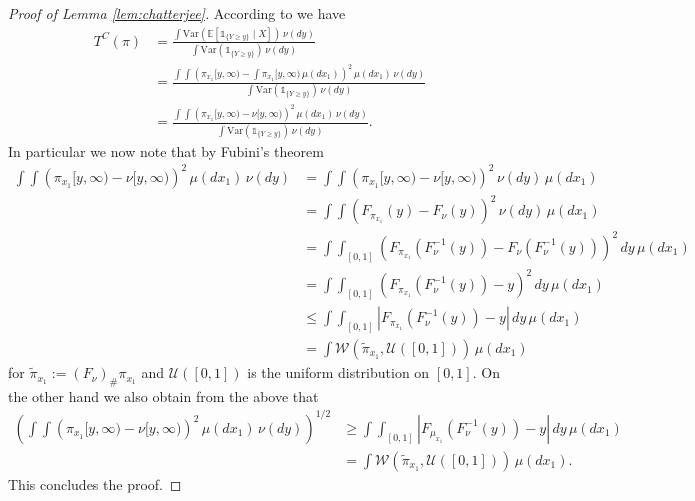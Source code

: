 \documentclass[10pt]{amsart}
\newcommand{\E}{\mathbb{E}}
\begin{document}
\begin{appendix}
\begin{proof}[Proof of Lemma \ref{lem:chatterjee}]
According to \cite[Theorem 1.1]{chatterjee2020new} we have
\begin{align*}
T^C(\pi)&= \frac{\int \text{Var}\left(\E\left[\mathds{1}_{\{Y \ge y\}} \mid X\right]\right)\,\nu(dy) }{\int \text{Var}\left( \mathds{1}_{\{Y\ge y\}}\right)\,\nu(dy)}\\
&= \frac{\int \int \left( \pi_{x_1}[y,\infty)-\int \pi_{x_1}[y,\infty)\,\mu(dx_1) \right)^2\,\mu(dx_1)\,\nu(dy)  }{\int \text{Var}\left( \mathds{1}_{\{Y\ge y\}}\right)\,\nu(dy)}\\
&= \frac{\int \int \left( \pi_{x_1}[y,\infty)-\nu[y,\infty) \right)^2\,\mu(dx_1)\,\nu(dy)  }{\int \text{Var}\left( \mathds{1}_{\{Y\ge y\}}\right)\,\nu(dy)}.
\end{align*}
In particular we now note that by Fubini's theorem
\begin{align*}
\int \int \left( \pi_{x_1}[y,\infty)-\nu[y,\infty) \right)^2\,\mu(dx_1)\,\nu(dy) &=\int \int \left( \pi_{x_1}[y,\infty)-\nu[y,\infty) \right)^2\,\nu(dy)\,\mu(dx_1)\\
&= \int \int \left( F_{\pi_{x_1}}(y)-F_{\nu}(y) \right)^2\,\nu(dy)\,\mu(dx_1)\\
&= \int \int_{[0,1]} \left( F_{\pi_{x_1}}(F^{-1}_\nu(y))-F_{\nu}(F^{-1}_\nu(y)) \right)^2\,dy\,\mu(dx_1)\\
&= \int \int_{[0,1]} \left( F_{\pi_{x_1}}(F^{-1}_\nu(y))-y \right)^2\,dy\,\mu(dx_1)\\
&\le \int \int_{[0,1]} \left| F_{\pi_{x_1}}(F_\nu^{-1}(y))-y \right| \,dy\,\mu(dx_1)\\
&=\int \mathcal{W}(\tilde{\pi}_{x_1}, \mathcal{U}([0,1]))\,\mu(dx_1)
\end{align*}
for $\tilde{\pi}_{x_1}:=(F_\nu)_{\#}\pi_{x_1}$ and $\mathcal{U}([0,1])$ is the uniform distribution on $[0,1]$.
On the other hand we also obtain from the above that
\begin{align*}
\left( \int \int \left( \pi_{x_1}[y,\infty)-\nu[y,\infty) \right)^2\,\mu(dx_1)\,\nu(dy) \right)^{1/2} &\ge \int \int_{[0,1]} \left| F_{\mu_{x_1}}(F_\nu^{-1}(y))-y \right| \,dy\,\mu(dx_1) \\
&= \int \mathcal{W}(\tilde{\pi}_{x_1}, \mathcal{U}([0,1]))\,\mu(dx_1).
\end{align*}
This concludes the proof.
\end{proof}


\end{appendix}
\end{document}

